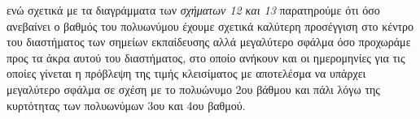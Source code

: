 \documentclass[Second Project.tex]{subfiles}
\begin{document}
ενώ σχετικά με τα διαγράμματα των \textit{σχήματων 12 και 13} παρατηρούμε ότι όσο ανεβαίνει ο βαθμός του 
πολυωνύμου έχουμε σχετικά καλύτερη προσέγγιση στο κέντρο του διαστήματος των σημείων εκπαίδευσης αλλά μεγαλύτερο 
σφάλμα όσο προχωράμε προς τα άκρα αυτού του διαστήματος, στο οποίο ανήκουν και οι ημερομηνίες για τις οποίες 
γίνεται η πρόβλεψη της τιμής κλεισίματος με αποτελέσμα να υπάρχει μεγαλύτερο σφάλμα σε σχέση με το πολυώνυμο 
2ου βάθμου και πάλι λόγω της κυρτότητας των πολυωνύμων 3ου και 4ου βαθμού. 
\end{document}
